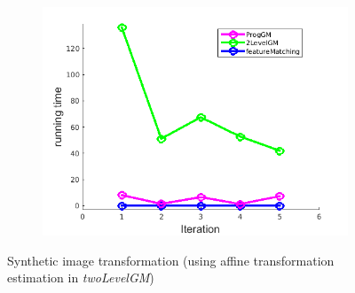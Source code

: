 \documentclass[
	fontsize=12pt,
	paper=a4,
	twoside=false,
	numbers=noenddot,
	plainheadsepline,
	toc=listof,
	toc=bibliography
]{scrartcl}
\begin{document}
\begin{figure}[h]
\begin{subfigure}[b]{0.3\textwidth}
		\includegraphics[scale=0.25]{"fig_ver2608/RealImages/Img_trafo/no_descr/using_ransac_afftrafo/time"}  
	\end{subfigure} 	
	\caption{Synthetic image transformation (using affine transformation estimation in \emph{twoLevelGM})}
\end{figure}
\FloatBarrier

\newpage
\end{document}
